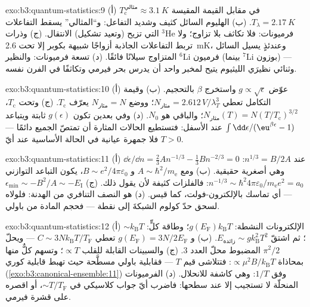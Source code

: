 \begin{solution}{exo:b3:quantum-statistics:9}
(أ) $T_{\text{c}}^{\text{مثالي}} \approx \qty{3.1}{K}$ في مقابل القيمة
المقيسة $T_\lambda = \qty{2.17}{K}$. (ب) الهليوم السائل كثيف
وشديد التفاعل: و``المثالي'' يسقط التفاعلات التي
تزيح (وتعيد تشكيل) الانتقال. (ج) وذرات $^3$He فرميونات:
فلا تكاثف بلا تزاوج؛ ولا تربط التفاعلات الجاذبة أزواجًا
شبيهة بكوبر إلا تحت \qty{2.6}{mK}، وعندئذٍ يسيل السائل المتزاوج
سيلانًا فائقًا. (د) تسعة فرميونات: والنظير $^6$Li فرميون (بينما
$^7$Li بوزون) --- وثنائي نظيرَي الليثيوم يتيح لمخبر
واحد أن يدرس بحر فيرمي وتكاثفًا في الفرن نفسه.
\end{solution}

\begin{solution}{exo:b3:quantum-statistics:10}
(أ) عوّض $g \propto \sqrt\epsilon$ واستخرج $\beta$ بالتحجيم.
(ب) وقيمة التكامل تعطي $N_{\text{مثار}} =
2.612\,V/\lambda_T^3$؛ ووضع $N_{\text{مثار}} = N$ يعرّف
$T_{\text{c}}$. (ج) وتحت $T_{\text{c}}$، $N_{\text{مثار}}(T) =
N(T/T_{\text{c}})^{3/2}$؛ والباقي هو $N_0$. (د) وفي بعدين
تكون $g(\epsilon)$ ثابتة ويتباعد $\int\dd\epsilon/(\eu^{
\beta\epsilon} - 1)$ عند الأسفل: فتستطيع الحالات المثارة
أن تمتصّ الجميع دائمًا --- فلا جمهرة عيانية في الحالة الأساسية
عند أيّ $T > 0$.
\end{solution}

\begin{solution}{exo:b3:quantum-statistics:11}
(أ) $\dd\epsilon/\dd n = \tfrac23 An^{-1/3} - \tfrac13 Bn^{-2/3} =
0$ عند $n^{1/3} = B/2A$: وهي أصغرية حقيقية. (ب) ومع $A \sim
\hbar^2/m_{\text{e}}$ و $B \sim e^2/4\pi\varepsilon_0$، يكون
التباعد التوازني $n^{-1/3} \sim \hbar^2 4\pi\varepsilon_0/
m_{\text{e}}e^2 = a_0$: فالفلزات كثيفة لأن 
يقول ذلك. (ج) $\epsilon_{\min} \sim -B^2/A \sim -E_{\text{I}}$
--- أي تماسك بالإلكترون-فولت، كما قيس. (د) 
هو النصف التنافري من الهدنة: فلولاه لسحق حدّ كولوم
الشبكةَ إلى نقطة --- فحجم المادة من باولي.
\end{solution}

\begin{solution}{exo:b3:quantum-statistics:12}
(أ) الإلكترونات النشطة: $g(E_{\text{F}})k_{\text{B}}T$؛ وطاقة كلٍّ:
$\sim k_{\text{B}}T$؛ ثم اشتقّ $E_{\text{زائدة}} \sim
g k_{\text{B}}^2T^2$. (ب) و $g(E_{\text{F}}) = 3N/2E_{\text{F}}$
تعطي $C \sim 3Nk_{\text{B}}T/T_{\text{F}}$ --- ويحلّ
$\pi^2/2$ المضبوط محلّ العدد 3. (ج) والسبينات القابلة للقلب $\propto T$؛ وتسهم
كلٌّ منها بمحاذاة $\propto \mu^2B/k_{\text{B}}T$: فتتلاشى
قيم $T$ --- فقابلية باولي مسطَّحة حيث تهبط قابلية كوري
(\cref{exo:b3:canonical-ensemble:11}) وفق $1/T$: وهي
كاشفة للانحلال. (د) الفرميونات المنحلّة لا تستجيب إلا عند
سطحها: فاضرب أيّ جواب كلاسيكي في $\sim
T/T_{\text{F}}$، أو اقصره على قشرة فيرمي.
\end{solution}

